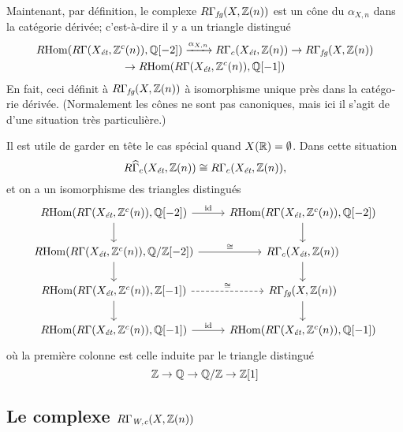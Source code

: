 \begin{otherlanguage}{french}
  Maintenant, par définition, le complexe $R\Gamma_\text{\it fg} (X, \mathbb{Z} (n))$
  est un cône du $\alpha_{X,n}$ dans la catégorie dérivée; c'est-à-dire il y a
  un triangle distingué
  \begin{multline*}
    R\!\operatorname{Hom} (R\Gamma (X_\text{\it ét}, \mathbb{Z}^c (n)), \mathbb{Q} [-2])
    \xrightarrow{\alpha_{X,n}} R\Gamma_c (X_\text{\it ét}, \mathbb{Z} (n)) \to
    R\Gamma_\text{\it fg} (X, \mathbb{Z} (n)) \\
    \to R\!\operatorname{Hom} (R\Gamma (X_\text{\it ét}, \mathbb{Z}^c (n)), \mathbb{Q} [-1])
  \end{multline*}
  En fait, ceci définit à $R\Gamma_\text{\it fg} (X, \mathbb{Z} (n))$ à isomorphisme
  unique près dans la catégorie dérivée. (Normalement les cônes ne sont pas
  canoniques, mais ici il s'agit de d'une situation très particulière.)

  \vspace{1em}

  Il est utile de garder en tête le cas spécial quand
  $X (\mathbb{R}) = \emptyset$. Dans cette situation
  $$R\widehat{\Gamma}_c (X_\text{\it ét}, \mathbb{Z} (n)) \cong R\Gamma_c (X_\text{\it ét}, \mathbb{Z} (n)),$$
  et on a un isomorphisme des triangles distingués
  \[ \begin{tikzcd}
    \RHom (R\Gamma (X_\text{\it ét}, \ZZ^c (n)), \QQ [-2]) \ar{r}{\idid}\ar{d} & \RHom (R\Gamma (X_\text{\it ét}, \ZZ^c (n)), \QQ [-2])\ar{d} \\
    \RHom (R\Gamma (X_\text{\it ét}, \ZZ^c (n)), \QQ/\ZZ [-2]) \ar{r}{\isom}\ar{d} & R\Gamma_c (X_\text{\it ét}, \ZZ (n))\ar{d} \\
    \RHom (R\Gamma (X_\text{\it ét}, \ZZ^c (n)), \ZZ [-1]) \ar[dashed]{r}{\isom}\ar{d} & R\Gamma_\text{\it fg} (X, \ZZ (n))\ar{d} \\
    \RHom (R\Gamma (X_\text{\it ét}, \ZZ^c (n)), \QQ [-1]) \ar{r}{\idid} & \RHom (R\Gamma (X_\text{\it ét}, \ZZ^c (n)), \QQ [-1])
  \end{tikzcd} \]
  où la première colonne est celle induite par le triangle distingué
  $$\mathbb{Z} \to \mathbb{Q} \to \mathbb{Q}/\mathbb{Z} \to \mathbb{Z} [1]$$

  \subsection*{Le complexe $R\Gamma_\text{\it W,c} (X, \mathbb{Z} (n))$}


\end{otherlanguage}
